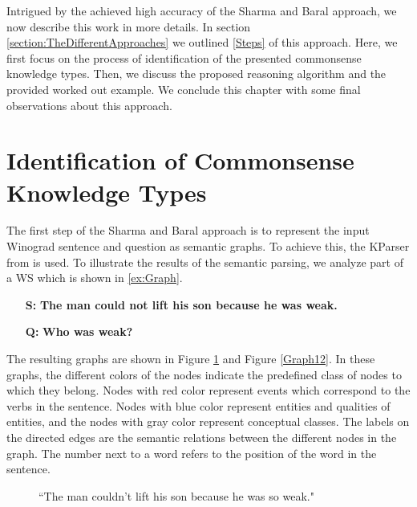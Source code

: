 \label{knowledge_types}
Intrigued by the achieved high accuracy of the Sharma and Baral \cite{2018CommonsenseKT} approach, we now describe this work in more details. In section \ref{section:TheDifferentApproaches} we outlined \underline{\ref{Steps}} of this approach. Here, we first focus on the process of identification of the presented commonsense knowledge types. Then, we discuss the proposed reasoning algorithm and the provided worked out example. We conclude this chapter with some final observations about this approach.


\section{Identification of Commonsense Knowledge Types}
The first step of the Sharma and Baral \cite{2018CommonsenseKT} approach is to represent the input Winograd sentence and question as semantic graphs. To achieve this, the KParser from \cite{DBLP:conf/ijcai/SharmaVAB15} is used. 
To illustrate the results of the semantic parsing, we analyze part of a WS which is shown in \ref{ex:Graph}.  \\ 
\begin{itemize}
	\item[\textbf{S:}] \textbf{The man could not lift his son because he was weak.}
	\item[\textbf{Q:}] \textbf{Who was weak?}
\end{itemize}

The  resulting graphs are shown in Figure \ref{Graph11} and Figure \ref{Graph12}.
In these graphs, the different colors of the nodes indicate the predefined class of nodes to which they belong. 
Nodes with red color represent events which correspond to the verbs in the sentence. Nodes with blue color represent entities and qualities of entities, and the nodes with gray color represent conceptual classes. The labels on the directed edges are the semantic relations between the different nodes in the graph. The number next to a word refers to the position of the word in the sentence. 
\begin{figure} [h!]
	\centering
	
	\caption{\label{Graph11}``The man couldn't lift his son because he was so weak."}
\end{figure}


